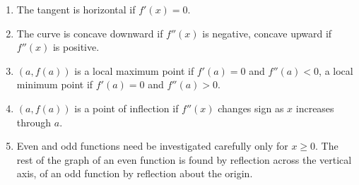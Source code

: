 \begin{enumerate}
\item The tangent is horizontal if $f'(x) = 0$.

\item The curve is concave downward if $f''(x)$ is negative, concave upward if $f''(x)$ is positive.

\item $(a,f(a))$ is a local maximum point if $f'(a) = 0$ and $f''(a) < 0$, a local minimum point if $f'(a) = 0$ and $f''(a) > 0$.

\item $(a,f(a))$ is a point of inflection if $f''(x)$ changes sign as $x$ increases through $a$.

\item Even and odd functions need be investigated carefully only for $x \geq 0$. The rest of the graph of an even function is found by reflection across the vertical axis, of an odd function by reflection about the origin.
\end{enumerate}

